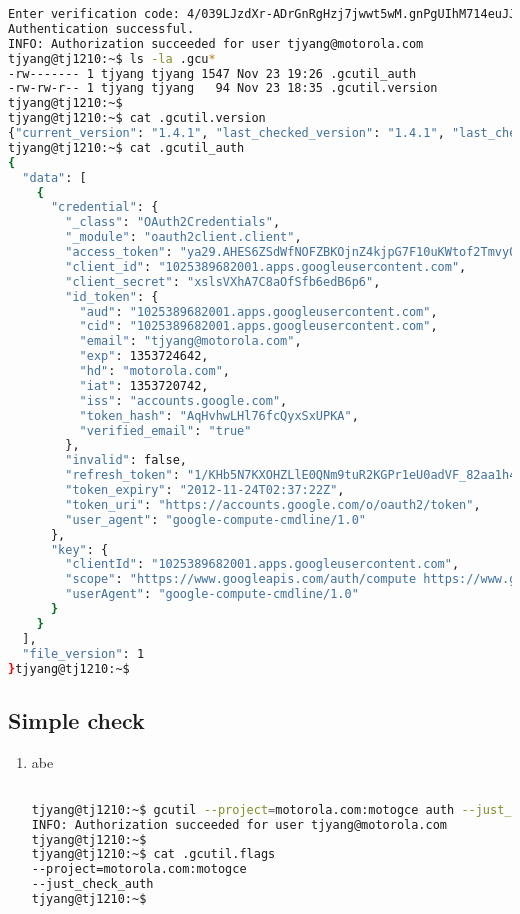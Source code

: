 \begin{enumerate}
\begin{lstlisting}[language=Bash]
Enter verification code: 4/039LJzdXr-ADrGnRgHzj7jwwt5wM.gnPgUIhM714euJJVnL49Cc_m9yJgdgI
Authentication successful.
INFO: Authorization succeeded for user tjyang@motorola.com
tjyang@tj1210:~$ ls -la .gcu*
-rw------- 1 tjyang tjyang 1547 Nov 23 19:26 .gcutil_auth
-rw-rw-r-- 1 tjyang tjyang   94 Nov 23 18:35 .gcutil.version
tjyang@tj1210:~$ 
tjyang@tj1210:~$ cat .gcutil.version 
{"current_version": "1.4.1", "last_checked_version": "1.4.1", "last_check": 1353717309.056243}tjyang@tj1210:~$ 
tjyang@tj1210:~$ cat .gcutil_auth 
{
  "data": [
    {
      "credential": {
        "_class": "OAuth2Credentials", 
        "_module": "oauth2client.client", 
        "access_token": "ya29.AHES6ZSdWfNOFZBKOjnZ4kjpG7F10uKWtof2TmvyOx9KmNQ", 
        "client_id": "1025389682001.apps.googleusercontent.com", 
        "client_secret": "xslsVXhA7C8aOfSfb6edB6p6", 
        "id_token": {
          "aud": "1025389682001.apps.googleusercontent.com", 
          "cid": "1025389682001.apps.googleusercontent.com", 
          "email": "tjyang@motorola.com", 
          "exp": 1353724642, 
          "hd": "motorola.com", 
          "iat": 1353720742, 
          "iss": "accounts.google.com", 
          "token_hash": "AqHvhwLHl76fcQyxSxUPKA", 
          "verified_email": "true"
        }, 
        "invalid": false, 
        "refresh_token": "1/KHb5N7KXOHZLlE0QNm9tuR2KGPr1eU0adVF_82aa1h4", 
        "token_expiry": "2012-11-24T02:37:22Z", 
        "token_uri": "https://accounts.google.com/o/oauth2/token", 
        "user_agent": "google-compute-cmdline/1.0"
      }, 
      "key": {
        "clientId": "1025389682001.apps.googleusercontent.com", 
        "scope": "https://www.googleapis.com/auth/compute https://www.googleapis.com/auth/compute.readonly https://www.googleapis.com/auth/devstorage.full_control https://www.googleapis.com/auth/devstorage.read_only https://www.googleapis.com/auth/devstorage.read_write https://www.googleapis.com/auth/devstorage.write_only https://www.googleapis.com/auth/userinfo.email", 
        "userAgent": "google-compute-cmdline/1.0"
      }
    }
  ], 
  "file_version": 1
}tjyang@tj1210:~$ 

  \end{lstlisting}
\end{enumerate}

\subsection{Simple check}
\begin{enumerate}
\item abe
  \begin{lstlisting}[language=Bash]

tjyang@tj1210:~$ gcutil --project=motorola.com:motogce auth --just_check_auth --cache_flag_values=True
INFO: Authorization succeeded for user tjyang@motorola.com
tjyang@tj1210:~$
tjyang@tj1210:~$ cat .gcutil.flags 
--project=motorola.com:motogce
--just_check_auth
tjyang@tj1210:~$ 
  \end{lstlisting}
\end{enumerate}

